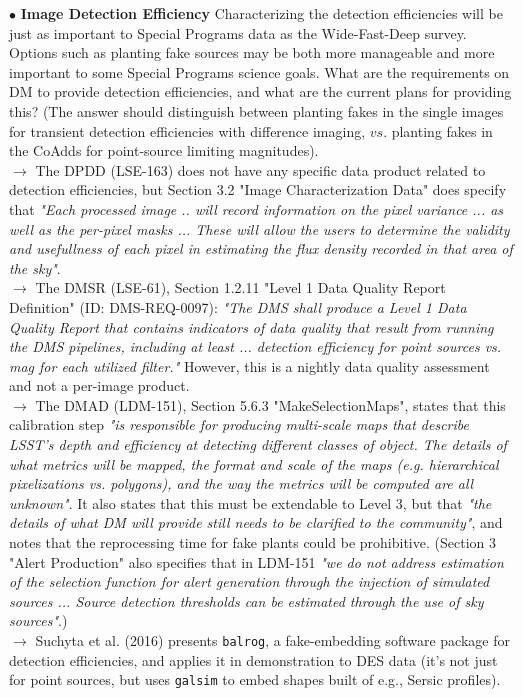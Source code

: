 \documentclass[DM,lsstdraft,toc]{lsstdoc}
\begin{document}
$\bullet$ \textbf{Image Detection Efficiency} Characterizing the detection efficiencies will be just as important to Special Programs data as the Wide-Fast-Deep survey. Options such as planting fake sources may be both more manageable and more important to some Special Programs science goals. What are the requirements on DM to provide detection efficiencies, and what are the current plans for providing this? (The answer should distinguish between planting fakes in the single images for transient detection efficiencies with difference imaging, $vs.$ planting fakes in the CoAdds for point-source limiting magnitudes). \\
$\rightarrow$ The DPDD (LSE-163) does not have any specific data product related to detection efficiencies, but Section 3.2 "Image Characterization Data" does specify that {\it "Each processed image .. will record information on the pixel variance ... as well as the per-pixel masks ... These will allow the users to determine the validity and usefullness of each pixel in estimating the flux density recorded in that area of the sky"}. \\
$\rightarrow$ The DMSR (LSE-61), Section 1.2.11 "Level 1 Data Quality Report Definition" (ID: DMS-REQ-0097): {\it "The DMS shall produce a Level 1 Data Quality Report that contains indicators of data quality that result from running the DMS pipelines, including at least ... detection efficiency for point sources vs. mag for each utilized filter."} However, this is a nightly data quality assessment and not a per-image product. \\
$\rightarrow$ The DMAD (LDM-151), Section 5.6.3 "MakeSelectionMaps", states that this calibration step {\it "is responsible for producing multi-scale maps that describe LSST's depth and efficiency at detecting different classes of object. The details of what metrics will be mapped, the format and scale of the maps (e.g. hierarchical pixelizations vs. polygons), and the way the metrics will be computed are all unknown"}. It also states that this must be extendable to Level 3, but that {\it "the details of what DM will provide still needs to be clarified to the community"}, and notes that the reprocessing time for fake plants could be prohibitive. (Section 3 "Alert Production" also specifies that in LDM-151 {\it "we do not address estimation of the selection function for alert generation through the injection of simulated sources ... Source detection thresholds can be estimated through the use of sky sources"}.)\\
$\rightarrow$ Suchyta et al. (2016) presents {\tt balrog}, a fake-embedding software package for detection efficiencies, and applies it in demonstration to DES data (it's not just for point sources, but uses {\tt galsim} to embed shapes built of e.g., Sersic profiles). \\
\end{document}
